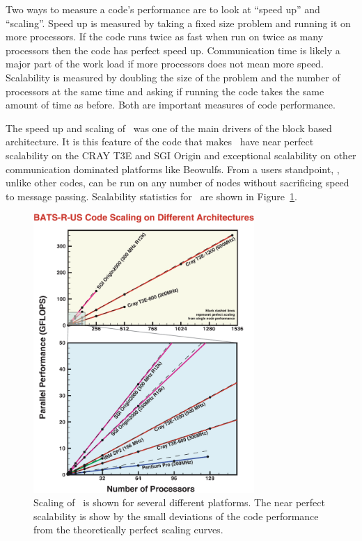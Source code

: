 Two ways to measure a code's performance are to look at ``speed up'' and 
``scaling''.  Speed up is measured by taking a fixed size problem and running
it on more processors.  If the code runs twice as fast when run on twice as 
many processors then the code has perfect speed up.  Communication time is 
likely a major part of the work load if more processors does not mean
more speed.    
Scalability is measured by doubling the size of the problem and the number
of processors at the same time and asking if running the code takes the
same amount of time as before.  
Both are important measures of code performance.

The speed up and scaling of \BATSRUS\ was
one of the main drivers of the block based architecture.  It is this
feature of the code that makes \BATSRUS\ have near perfect scalability
on the CRAY T3E and SGI Origin and exceptional scalability on other
communication dominated platforms like Beowulfs.  From a users standpoint,
\BATSRUS, unlike other codes, can be run on any number of nodes without
sacrificing speed to message passing.  Scalability statistics for \BATSRUS\
are shown in
Figure~\ref{fig:scalability}.
\begin{figure}
\begin{center}
\includegraphics*[width=8.4cm]{NewScaling.eps}
\end{center}
\caption{Scaling of \BATSRUS\ is shown for several 
different platforms.  The 
near perfect scalability is show by the small deviations of the code performance
from the theoretically perfect scaling curves.}
\label{fig:scalability}
\end{figure}


